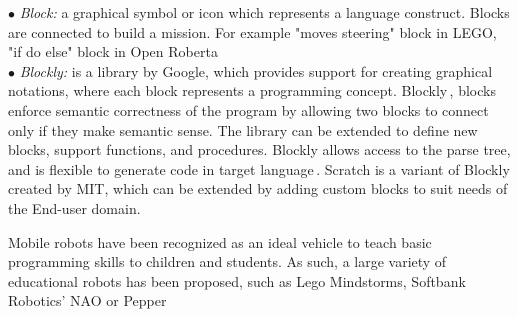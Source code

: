 $\bullet$ \emph{Block:} a graphical symbol or icon  which represents  a language construct.  Blocks are connected to build a mission. For example "moves steering" block in LEGO, "if do else" block in Open Roberta ~\cite{OpenRoberta}\\ %
$\bullet$ \emph{Blockly:} is a library by Google, which provides support for creating graphical notations, where each block represents a programming concept. %
Blockly\,\cite{blockly}, blocks enforce semantic correctness of the program by allowing two blocks to connect only if they make semantic sense.
The library can be extended to define new blocks, support functions, and procedures. Blockly allows access to the parse tree, and is flexible to generate code in target language\,\cite{Passault2016}. Scratch is a variant of Blockly created by MIT, which can be extended by adding custom blocks to suit needs of the End-user domain.

Mobile robots have been recognized as an ideal vehicle to teach basic programming skills to children and students. As such, a large variety of educational robots has been proposed, such as Lego Mindstorms, Softbank Robotics' NAO or Pepper
